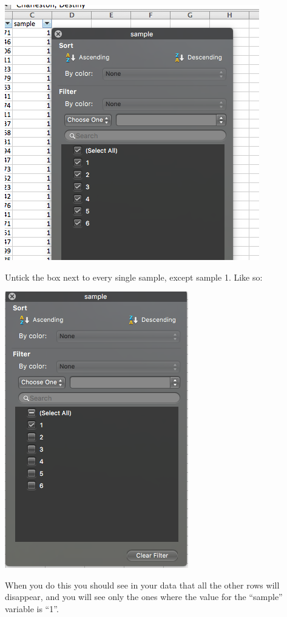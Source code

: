 \documentclass[]{book}
\theoremstyle{definition}
\theoremstyle{definition}
\theoremstyle{definition}
\theoremstyle{remark}
\begin{document}
\includegraphics{imgs/filter_options.png}

Untick the box next to every single sample, except sample 1. Like so:

\includegraphics{imgs/filter_sample_1.png}

When you do this you should see in your data that all the other rows
will disappear, and you will see only the ones where the value for the
``sample'' variable is ``1''.
\end{document}
